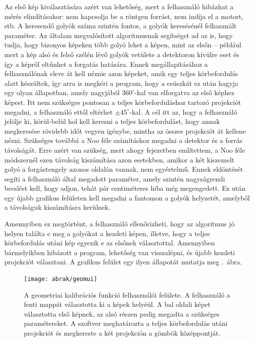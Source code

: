 \documentclass[a4paper,12pt]{article}
\begin{document}
Az első kép kiválasztására azért van lehetőség, mert a felhasználó hibázhat a mérés elindításakor: nem kapcsolja be a röntgen forrást, nem indíja el a motort, stb. A keresendő golyók száma szintén fontos, a golyók keresésénél felhasznált paraméter. Az általam megvalósított algoritmusnak segítséget ad az is, hogy tudja, hogy bizonyos képeken több golyó lehet a képen, mint az elsőn -- például mert a kép alsó és felső szélén lévő golyók vetülete a detektoron kívülre eset és így a képről eltűnhet a forgatás hatására. Ennek megállapításához a felhasználónak eleve át kell néznie azon képeket, amik egy teljes körbefordulás alatt készültek, így arra is megkéri a program, hogy a csúszkát ez után hagyja egy olyan állapotban, amely nagyjából  $360^\circ$-kal van elforgatva az első képhez képest. Itt nem szükséges pontosan a teljes körbeforduláshoz tartozó projekciót megadni, a felhasználó ettől eltérhet $\pm 45^\circ$-kal. A cél itt az, hogy a felhasználó jelölje ki, körül-belül hol kell keresni a teljes körbefordulást, hogy annak megkeresése rövidebb időt vegyen igénybe, mintha az összes projekciót át kellene nézni. Szükséges továbbá a Noo féle számításhoz megadni a detektor és a forrás távolságát. Erre azért van szükség, mert ahogy  fejezetben említettem, a Noo féle módszernél ezen távolság kiszámítása azon esetekben, amikor a két kiszemelt golyó a forgástengely azonos oldalán vannak, nem egyértelmű. Ennek eldöntését segíti a felhasználó által megadott paraméter, amely szintén nagyságrendi becslést kell, hogy adjon, tehát pár centiméteres hiba még megengedett. Ez után egy újabb grafikus felületen kell megadni a fantomon a golyók helyzetét, amelyből a távolságuk kiszámításra kerülnek.


Amennyiben ez megtörtént, a felhasználó ellenőrizheti, hogy az algoritmus jó helyen találta e meg a golyókat a kezdeti képen, illetve, hogy a teljes körbefordulás utáni kép egyezik e az elsőnek választottal. Amennyiben bármelyikben hibázott a program, lehetőség van visszalépni, és újabb kezdeti projekciót választani. A grafikus felület egy ilyen állapotát mutatja meg  .~ábra. 


\begin{figure}[htbp]
\center
\texttt{[image: abrak/geomui]}
\caption{A geometriai kalibrációs funkció felhasználói felülete. A felhasználó a fenti mappát választotta ki a képek helyéül. A bal oldali képet választotta első képnek, az alsó részen pedig megadta a szükséges paramétereket. A szoftver meghatározta a teljes körbefordulás utáni projekciót és megkereste a két projekción a gömbök középpontját. }
\label{fig:geomui}
\end{figure}
\end{document}
